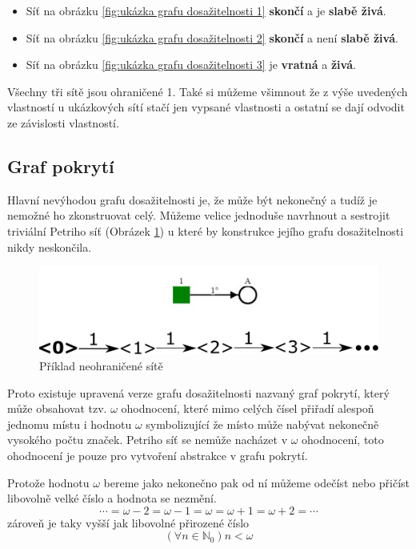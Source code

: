 \documentclass[
  biblatex,
  glossaries,
]{kidiplom}
\begin{document}
\begin{itemize}
  \item 
  Síť na obrázku \ref{fig:ukázka grafu dosažitelnosti 1} \textbf{skončí} a je \textbf{slabě živá}.
  \item 
  Síť na obrázku \ref{fig:ukázka grafu dosažitelnosti 2} \textbf{skončí} a není \textbf{slabě živá}.
  \item 
  Síť na obrázku \ref{fig:ukázka grafu dosažitelnosti 3} je \textbf{vratná} a \textbf{živá}.
\end{itemize}

Všechny tři sítě jsou ohraničené 1. Také si můžeme všimnout že 
z výše uvedených vlastností u ukázkových sítí 
stačí jen vypsané vlastnosti a ostatní se dají odvodit ze závislosti vlastností.


\subsection{Graf pokrytí}

Hlavní nevýhodou grafu dosažitelnosti je, že může být
nekonečný a tudíž je nemožné ho zkonstruovat celý.
Můžeme velice jednoduše navrhnout a sestrojit triviální Petriho síť (Obrázek \ref{fig:neohraničená síť}) u které by konstrukce jejího grafu dosažitelnosti nikdy neskončila.

\begin{figure}[h]
  \centering
  \includegraphics[width=\linewidth]{net_unbounded_reachability}
  \caption{Příklad neohraničené sítě}\label{fig:neohraničená síť}
\end{figure}

Proto existuje upravená verze grafu dosažitelnosti nazvaný graf pokrytí,
který může obsahovat tzv. $\omega$ ohodnocení, které mimo celých 
čísel přiřadí alespoň jednomu místu i hodnotu $\omega$ 
symbolizující že místo může nabývat nekonečně vysokého počtu značek.
Petriho síť se nemůže nacházet v $\omega$ ohodnocení, toto ohodnocení je pouze
pro vytvoření abstrakce v grafu pokrytí.

Protože hodnotu $\omega$ bereme jako nekonečno pak od ní můžeme 
odečíst nebo přičíst libovolně velké číslo a hodnota se nezmění.
$$\dotsb = \omega - 2 = \omega - 1 = \omega = \omega + 1 = \omega + 2 = \dotsb$$
zároveň je taky vyšší jak libovolné přirozené číslo
$$ (\forall n \in \mathbb{N}_0)n < \omega $$
\end{document}
